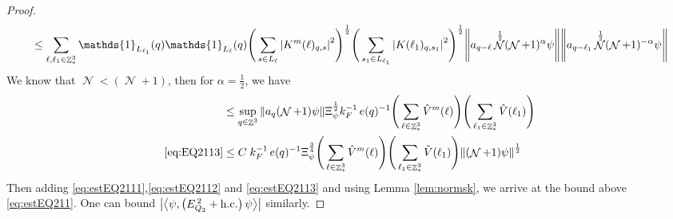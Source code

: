 \documentclass[sn-mathphys, Numbered ,a4paper]{sn-jnl}%
\DeclareMathOperator{\Z}{\mathbb{Z}}
\DeclareMathOperator{\NN}{\mathcal{N}}
\newcommand{\half}{\frac{1}{2}}
\newcommand{\eva}[1]{\left\langle #1 \right\rangle}
\theoremstyle{plain}
\theoremstyle{definition}
\theoremstyle{remark}
\theoremstyle{plain}
\theoremstyle{definition}
\theoremstyle{remark}
\begin{document}
\begin{proof}
\begin{align}
	&\leq\sum\limits_{\ell, \ell_1\in \Z^3_*} \mathds{1}_{L_{\ell_1}}(q) \mathds{1}_{L_{\ell}}(q) \Bigg(\sum\limits_{s \in L_{\ell}} \abs{K^m(\ell)_{q,s}}^2\Bigg)^\half \Bigg(\sum\limits_{s_1 \in L_{\ell_1}} \abs{K(\ell_1)_{q,s_1}}^2\Bigg)^\half \norm{ a_{q-\ell} \NN^\half (\NN+1)^{\alpha}\psi} \norm{ a_{q-\ell_1} \NN^\half (\NN+1)^{-\alpha} \psi }\nonumber\\
\end{align}
We know that $\NN<(\NN+1)$, then for $\alpha = \half$, we have
\begin{align}
	&\leq \sup_{q \in \Z^3}\norm{ a_{q} (\NN+1)\psi} \Xi_{\psi}^\half k_F^{-1}\, e(q)^{-1} \Bigg( \sum\limits_{\ell \in \Z^3_*}  \hat{V}^{m}(\ell) \Bigg) \Bigg(\sum\limits_{ \ell_1\in \Z^3_*} \hat{V}(\ell_1)\Bigg)  \nonumber\\
	\eqref{eq:EQ2113}&\leq C\; k_F^{-1}\, e(q)^{-1} \Xi_{\psi}^{\frac{3}{4}} \Bigg( \sum\limits_{\ell \in \Z^3_*}  \hat{V}^{m}(\ell) \Bigg) \Bigg(\sum\limits_{ \ell_1\in \Z^3_*} \hat{V}(\ell_1)\Bigg) \norm{ (\NN+1)\psi}^\half \label{eq:estEQ2113}
\end{align}
  Then adding \eqref{eq:estEQ2111},\eqref{eq:estEQ2112} and \eqref{eq:estEQ2113} and using Lemma \ref{lem:normsk}, we arrive at the bound above \eqref{eq:estEQ211}. One can bound $\abs{\eva{\psi,\left(E^{\,2}_{Q_2}+\mathrm{h.c.}\right) \psi }}$ similarly.
\end{proof}
\end{document}
